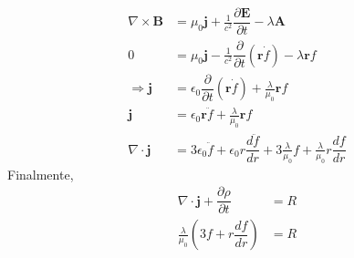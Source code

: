 \documentclass[]{article}
\numberwithin{equation}{section}
\newcommand{\0}{\textcolor{gray}{0}}
\newcommand{\di}{\nabla\cdot}
\newcommand{\ro}{\nabla\times}
\newcommand{\rv}{\mathbf{r}}
\newcommand{\eo}{\epsilon_{0}}
\newcommand{\uo}{\mu_{0}}
\newcommand{\pd}[2]{\dfrac{\partial #1}{\partial #2}}
\newcommand{\td}[2]{\dfrac{d #1}{d #2}}
\newcommand{\n}[1]{\mathbf{#1}}
\begin{document}
\begin{enumerate}
\begin{enumerate}
\begin{align*}
			\ro\n{B} &= \uo\n{j} + \frac{1}{c^2}\pd{\n{E}}{t} - \lambda\n{A}\\
			0 &= \uo\n{j} - \frac{1}{c^2}\pd{}{t}\left(\rv\dot{f}\right) - \lambda \rv f\\
			\Rightarrow \n{j} &= \eo\pd{}{t}\left(\rv\dot{f}\right) + \frac{\lambda}{\uo} \rv f\\
			\n{j} &= \eo\rv\ddot{f} + \frac{\lambda}{\uo} \rv f\\
			\di \n{j} &= 3\eo\ddot{f} + \eo r\td{\ddot{f}}{r} + 3 \frac{\lambda}{\uo} f + \frac{\lambda}{\uo} r\td{f}{r}
		\end{align*}
		Finalmente,
		\begin{align*}
			\di\n{j} + \pd{\rho}{t} &= R\\
			\frac{\lambda}{\uo}\left(3 f + r\td{f}{r}\right) &= R
		\end{align*}
	\end{enumerate}
\end{enumerate}
\end{document}
